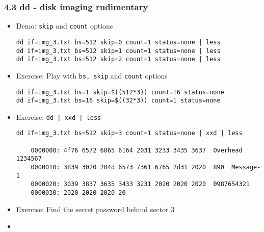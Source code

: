\begin{frame}[fragile]
  \frametitle{4.3 dd - disk imaging rudimentary}
    \begin{itemize}
        \item[] Demo: \texttt{skip} and \texttt{count} options
\begin{lstlisting}[basicstyle=\tiny]
dd if=img_3.txt bs=512 skip=0 count=1 status=none | less
dd if=img_3.txt bs=512 skip=1 count=1 status=none | less
dd if=img_3.txt bs=512 skip=2 count=1 status=none | less
\end{lstlisting}
        \item[] Exercise: Play with \texttt{bs, skip} and \texttt{count} options
\begin{lstlisting}[basicstyle=\tiny]
dd if=img_3.txt bs=1 skip=$((512*3)) count=16 status=none
dd if=img_3.txt bs=16 skip=$((32*3)) count=1 status=none
\end{lstlisting}
        \item[] Exercise: \texttt{dd | xxd | less}
\begin{lstlisting}[basicstyle=\tiny]
dd if=img_3.txt bs=512 skip=3 count=1 status=none | xxd | less

    0000000: 4f76 6572 6865 6164 2031 3233 3435 3637  Overhead 1234567
    0000010: 3839 3020 204d 6573 7361 6765 2d31 2020  890  Message-1  
    0000020: 3039 3837 3635 3433 3231 2020 2020 2020  0987654321      
    0000030: 2020 2020 2020 20
\end{lstlisting}
        \item[] Exercise: Find the secret password behind sector 3
        \item[] 
    \end{itemize}
\end{frame}


